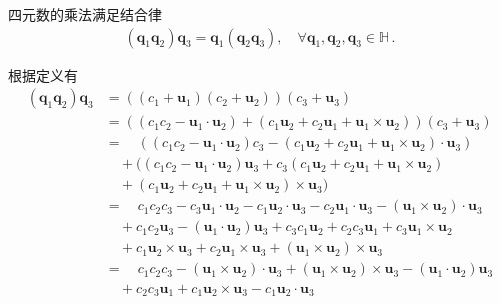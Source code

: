 \begin{proposition}
    四元数的乘法满足结合律
    \begin{align}
        ({\bm q}_1{\bm q}_2){\bm q}_3={\bm q}_1({\bm q}_2{\bm q}_3), \quad \forall {\bm q}_1, {\bm q}_2, {\bm q}_3\in \mathbb{H}\, .
    \end{align}
\end{proposition}
\begin{prove}
    根据定义有
    \begin{align}
        ({\bm q}_1{\bm q}_2){\bm q}_3 & =((c_1+{\bm u}_1)(c_2+{\bm u}_2))(c_3+{\bm u}_3)\nonumber                                                                                           \\
                                      & =((c_1c_2-{\bm u}_1\cdot{\bm u}_2)+(c_1{\bm u}_2+c_2{\bm u}_1+{\bm u}_1\times{\bm u}_2))(c_3+{\bm u}_3)\nonumber                                    \\
                                      & =\quad ((c_1c_2-{\bm u}_1\cdot{\bm u}_2)c_3-(c_1{\bm u}_2+c_2{\bm u}_1+{\bm u}_1\times{\bm u}_2)\cdot{\bm u}_3)\nonumber                            \\
                                      & \quad +((c_1c_2-{\bm u}_1\cdot{\bm u}_2){\bm u}_3+c_3(c_1{\bm u}_2+c_2{\bm u}_1+{\bm u}_1\times{\bm u}_2)\nonumber                                  \\
                                      & \quad +(c_1{\bm u}_2+c_2{\bm u}_1+{\bm u}_1\times{\bm u}_2)\times{\bm u}_3)\nonumber                                                                \\
                                      & =\quad c_1c_2c_3-c_3{\bm u}_1\cdot{\bm u}_2-c_1{\bm u}_2\cdot{\bm u}_3-c_2{\bm u}_1\cdot{\bm u}_3-({\bm u}_1\times{\bm u}_2)\cdot{\bm u}_3\nonumber \\
                                      & \quad +c_1c_2{\bm u}_3-({\bm u}_1\cdot{\bm u}_2){\bm u}_3+c_3c_1{\bm u}_2+c_2c_3{\bm u}_1+c_3{\bm u}_1\times{\bm u}_2\nonumber                      \\
                                      & \quad +c_1{\bm u}_2\times{\bm u}_3+c_2{\bm u}_1\times{\bm u}_3+({\bm u}_1\times{\bm u}_2)\times{\bm u}_3\nonumber                                   \\
                                      & =\quad  c_1c_2c_3-({\bm u}_1\times{\bm u}_2)\cdot{\bm u}_3+({\bm u}_1\times{\bm u}_2)\times{\bm u}_3-({\bm u}_1\cdot{\bm u}_2){\bm u}_3\nonumber    \\
                                      & \quad +c_2c_3{\bm u}_1+c_1{\bm u}_2\times{\bm u}_3-c_1{\bm u}_2\cdot{\bm u}_3\nonumber                                                              \\

\end{align}
\end{prove}
